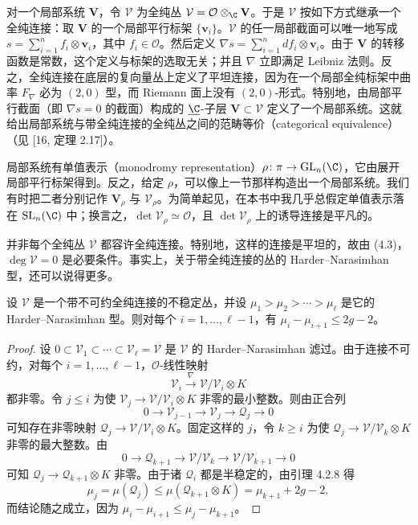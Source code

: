 对一个局部系统 $\mathbf{V}$，令 $\mathcal{V}$ 为全纯丛 $\mathcal{V}=\mathcal{O}\otimes_\C\mathbf{V}$。于是 $\mathcal{V}$ 按如下方式继承一个全纯连接：取 $\mathbf{V}$ 的一个局部平行标架 $\{\mathbf{v}_i\}$。$\mathcal{V}$ 的任一局部截面可以唯一地写成 $s=\sum_{i=1}^n f_i\otimes\mathbf{v}_i$，其中 $f_i\in\mathcal{O}$。然后定义 $\nabla s=\sum_{i=1}^n df_i\otimes\mathbf{v}_i$。由于 $\mathbf{V}$ 的转移函数是常数，这个定义与标架的选取无关；并且 $\nabla$ 立即满足 Leibniz 法则。反之，全纯连接在底层的复向量丛上定义了平坦连接，因为在一个局部全纯标架中曲率 $F_\nabla$ 必为 $(2,0)$ 型，而 Riemann 面上没有 $(2,0)$-形式。特别地，由局部平行截面（即 $\nabla s=0$ 的截面）构成的 $\underline{\C}$-子层 $\mathbf{V}\subset\mathcal{V}$ 定义了一个局部系统。这就给出局部系统与带全纯连接的全纯丛之间的范畴等价（categorical equivalence）（见 [16, 定理 2.17]）。

局部系统有单值表示（monodromy representation）$\rho\colon\pi\to\mathrm{GL}_n(\C)$，它由展开局部平行标架得到。反之，给定 $\rho$，可以像上一节那样构造出一个局部系统。我们有时把二者分别记作 $\mathbf{V}_\rho$ 与 $\mathcal{V}_\rho$。为简单起见，在本书中我几乎总假定单值表示落在 $\mathrm{SL}_n(\C)$ 中；换言之，$\det\mathcal{V}_\rho\simeq\mathcal{O}$，且 $\det\mathcal{V}_\rho$ 上的诱导连接是平凡的。

并非每个全纯丛 $\mathcal{V}$ 都容许全纯连接。特别地，这样的连接是平坦的，故由 (4.3)，$\deg\mathcal{V}=0$ 是必要条件。事实上，关于带全纯连接的丛的 Harder--Narasimhan 型，还可以说得更多。

\begin{proposition}[{cf.\ [8, 23]}]
设 $\mathcal{V}$ 是一个带不可约全纯连接的不稳定丛，并设 $\mu_1>\mu_2>\cdots>\mu_\ell$ 是它的 Harder--Narasimhan 型。则对每个 $i=1,\dots,\ell-1$，有 $\mu_i-\mu_{i+1}\le 2g-2$。
\end{proposition}

\begin{proof}
设 $0\subset\mathcal{V}_1\subset\cdots\subset\mathcal{V}_\ell=\mathcal{V}$ 是 $\mathcal{V}$ 的 Harder--Narasimhan 滤过。由于连接不可约，对每个 $i=1,\dots,\ell-1$，$\mathcal{O}$-线性映射
\[
\mathcal{V}_i\xrightarrow{\ \nabla\ }\mathcal{V}/\mathcal{V}_i\otimes K
\]
都非零。令 $j\le i$ 为使 $\mathcal{V}_j\to\mathcal{V}/\mathcal{V}_i\otimes K$ 非零的最小整数。则由正合列
\[
0\longrightarrow\mathcal{V}_{j-1}\longrightarrow\mathcal{V}_j\longrightarrow\mathcal{Q}_j\longrightarrow 0
\]
可知存在非零映射 $\mathcal{Q}_j\to\mathcal{V}/\mathcal{V}_i\otimes K$。固定这样的 $j$，令 $k\ge i$ 为使 $\mathcal{Q}_j\to\mathcal{V}/\mathcal{V}_k\otimes K$ 非零的最大整数。由
\[
0\longrightarrow\mathcal{Q}_{k+1}\longrightarrow\mathcal{V}/\mathcal{V}_k\longrightarrow\mathcal{V}/\mathcal{V}_{k+1}\longrightarrow 0
\]
可知 $\mathcal{Q}_j\to\mathcal{Q}_{k+1}\otimes K$ 非零。由于诸 $\mathcal{Q}_i$ 都是半稳定的，由引理 4.2.8 得
\[
\mu_j=\mu(\mathcal{Q}_j)\le\mu(\mathcal{Q}_{k+1}\otimes K)=\mu_{k+1}+2g-2,
\]
而结论随之成立，因为 $\mu_i-\mu_{i+1}\le\mu_j-\mu_{k+1}$。
\end{proof}

